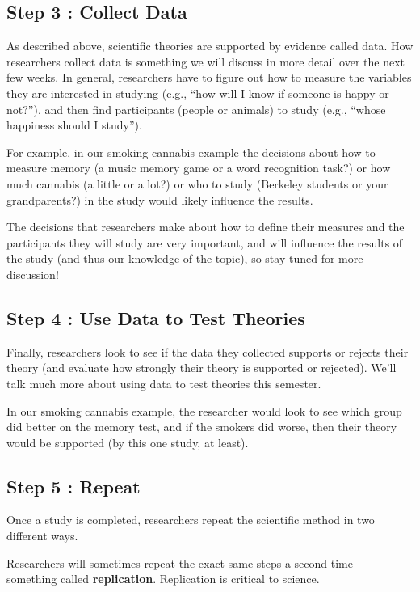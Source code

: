 \documentclass[
  letterpaper,
  DIV=11,
  numbers=noendperiod,
  oneside]{scrreprt}
\begin{document}
\subsection{Step 3 : Collect Data}\label{step-3-collect-data}

As described above, scientific theories are supported by evidence called
data. How researchers collect data is something we will discuss in more
detail over the next few weeks. In general, researchers have to figure
out how to measure the variables they are interested in studying (e.g.,
``how will I know if someone is happy or not?''), and then find
participants (people or animals) to study (e.g., ``whose happiness
should I study'').~

For example, in our smoking cannabis example the decisions about how to
measure memory (a music memory game or a word recognition task?) or how
much cannabis (a little or a lot?) or who to study (Berkeley students or
your grandparents?) in the study would likely influence the results.

The decisions that researchers make about how to define their measures
and the participants they will study are very important, and will
influence the results of the study (and thus our knowledge of the
topic), so stay tuned for more discussion!

\subsection{Step 4 : Use Data to Test
Theories}\label{step-4-use-data-to-test-theories}

Finally, researchers look to see if the data they collected supports or
rejects their theory (and evaluate how strongly their theory is
supported or rejected). We'll talk much more about using data to test
theories this semester.

In our smoking cannabis example, the researcher would look to see which
group did better on the memory test, and if the smokers did worse, then
their theory would be supported (by this one study, at least).

\subsection{Step 5 : Repeat}\label{step-5-repeat}

Once a study is completed, researchers repeat the scientific method in
two different ways.

Researchers will sometimes repeat the exact same steps a second time -
something called \textbf{replication}. Replication is critical to
science.
\end{document}
